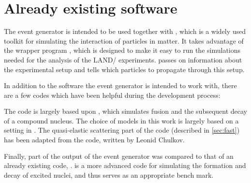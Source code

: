\section{Already existing software}
\label{sec:exsoft}
The event generator is intended to be used together with , which is a widely used toolkit for simulating the interaction of particles in matter\cite{allison:2006:art}. It takes advantage of the wrapper program \cite{johansson:2013:online}, which is designed to make it easy to run the simulations needed for the analysis of the LAND/\rtb{} experiments.  passes on information about the experimental setup and tells  which particles to propagate through this setup.

In addition to the software the event generator is intended to work with, there are a few codes which have been helpful during the development process:

The code is largely based upon \cite{gollerthan:1988:thesis}, which simulates fusion and the subsequent decay of a compound nucleus. The choice of models in this work is largely based on a setting in .
The quasi-elastic scattering part of the code (described in \autoref{sec:fast}) has been adapted from the  code, written by Leonid Chulkov.

Finally, part of the output of the event generator was compared to that of an already existing code, \cite{talys:2015}.  is a more advanced code for simulating the formation and decay of excited nuclei, and thus serves as an appropriate bench mark. %